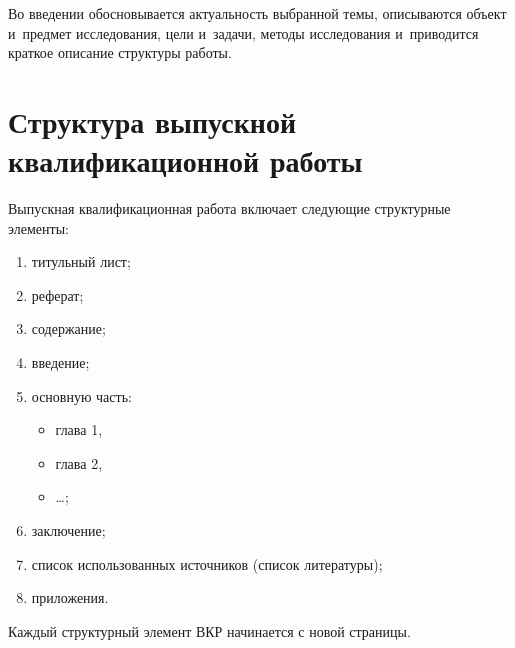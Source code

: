 \documentclass[a4paper,14pt]{diplom}
\begin{document}
\maketitle

\begin{abstract}
Это пример оформления дипломной работы с помощью издательской системы \LaTeXe.

Реферат размещается <<непосредственно>> за титульным листом. Объем реферата должен составлять не более половины страницы. В~реферате указываются параметры ВКР: объем работы в страницах, количество глав, иллюстраций, таблиц, приложений, использованных источников. Перечень ключевых слов должен включать от~5 до~15 слов или словосочетаний из текста работы, которые в~наибольшей мере характеризуют ее содержание и~обеспечивают возможность информационного поиска. Ключевые слова приводятся в именительном падеже и~печатаются прописными буквами полужирным шрифтом в~строку через запятые.

Текст реферата должен отражать объект исследования, цель работы, результаты работы, область применения, степень внедрения или рекомендации по~внедрению.
\end{abstract}

\tableofcontents[Содержание]

Во введении обосновывается актуальность выбранной темы,
описываются объект и~предмет исследования, цели и~задачи, методы исследования и~приводится краткое описание структуры работы.

\chapter[Структура выпускной квалификационной работы]{Структура выпускной\\ квалификационной работы}
Выпускная квалификационная работа включает следующие структурные элементы:
\begin{enumerate}[label=\arabic{enumi})]
  \item титульный лист;
  \item реферат;
  \item содержание;
  \item введение;
  \item основную часть:
  \begin{itemize}
    \item глава 1,
    \item глава 2,
    \item \dots;
  \end{itemize}
  \item заключение;
  \item список использованных источников (список литературы);
  \item приложения.
\end{enumerate}
Каждый структурный элемент ВКР начинается с новой страницы.
\end{document}
